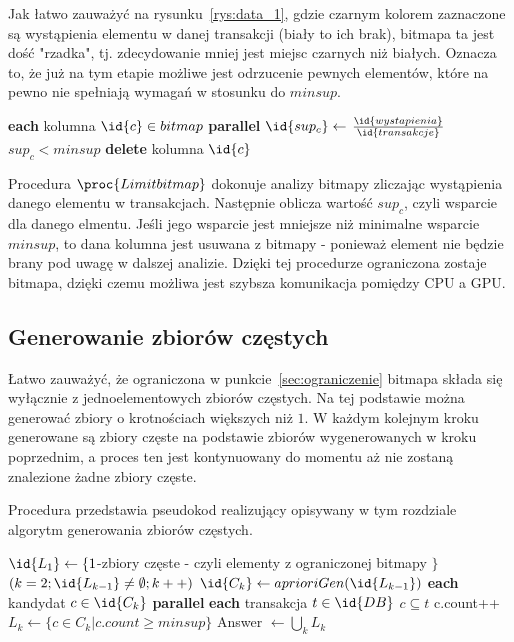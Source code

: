 Jak łatwo zauważyć na rysunku~\ref{rys:data_1}, gdzie czarnym kolorem zaznaczone są wystąpienia elementu w danej transakcji (biały to ich brak), bitmapa ta jest dość "rzadka", tj. zdecydowanie mniej jest miejsc czarnych niż białych. Oznacza to, że już na tym etapie możliwe jest odrzucenie pewnych elementów, które na pewno nie spełniają wymagań w stosunku do $minsup$.


\begin{codebox}
		\li \For \textbf{each} kolumna $\id{c} \in bitmap$ \textbf{parallel}
		\li \Do
			\li $\id{sup_c} \gets$ $\frac{\id{wystapienia}}{\id{transakcje}}$
				\li \If $sup_c < minsup$
					\li \Then
						\textbf{delete} kolumna $\id{c}$
					\End
		\End
\end{codebox}

Procedura $\proc{Limit bitmap}$ dokonuje analizy bitmapy zliczając wystąpienia danego elementu w transakcjach. Następnie oblicza wartość $sup_c$, czyli wsparcie dla danego elmentu. Jeśli jego wsparcie jest mniejsze niż minimalne wsparcie $minsup$, to dana kolumna jest usuwana z bitmapy - ponieważ element nie będzie brany pod uwagę w dalszej analizie. Dzięki tej procedurze ograniczona zostaje bitmapa, dzięki czemu możliwa jest szybsza komunikacja pomiędzy CPU a GPU.

\subsection{Generowanie zbiorów częstych}\label{capriori:gen}

Łatwo zauważyć, że ograniczona w punkcie~\ref{sec:ograniczenie} bitmapa składa się wyłącznie z jednoelementowych zbiorów częstych. Na tej podstawie można generować zbiory o krotnościach większych niż $1$. W każdym kolejnym kroku generowane są zbiory częste na podstawie zbiorów wygenerowanych w kroku poprzednim, a proces ten jest kontynuowany do momentu aż nie zostaną znalezione żadne zbiory częste.

Procedura  przedstawia pseudokod realizujący opisywany w tym rozdziale algorytm generowania zbiorów częstych.

\begin{codebox}
	\label{apriori:listing}
	\li $\id{L_1} \gets \lbrace 1$-zbiory częste - czyli elementy z ograniczonej bitmapy $\rbrace$
		\li \For $(k = 2; \id{L_{k-1}} \neq \emptyset; k++)$
		\li \Do
			 $\id{C_k} \gets aprioriGen(\id{L_{k-1}})$
			\li \For \textbf{each} kandydat $c \in \id{C_k}$ \textbf{parallel}
			\li \Do
					\li \For \textbf{each} transakcja $t \in \id{DB}$
					\li \If $c \subseteq t$
					\li \Then
						\Do c.count++
						\End
					\End
				\End
			\li $L_k \gets \lbrace c \in C_k | c.count \geq minsup \rbrace$	
		\End
	\li Answer $\gets \bigcup_k L_k $
\end{codebox}

